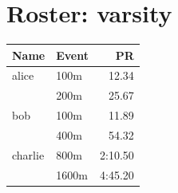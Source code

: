 \documentclass[11pt]{article}
\begin{document}
\section*{Roster: varsity}
\begin{tabularx}{\textwidth}{lXr}
\toprule
\textbf{Name} & \textbf{Event} & \textbf{PR} \\
\midrule
alice & 100m & 12.34 \\
& 200m & 25.67 \\
\midrule
bob & 100m & 11.89 \\
& 400m & 54.32 \\
\midrule
charlie & 800m & 2:10.50 \\
& 1600m & 4:45.20 \\
\midrule
\bottomrule
\end{tabularx}
\end{document}
